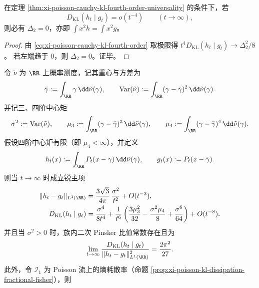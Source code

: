 \begin{corollary}\label{cor:xi-poisson-cauchy-kl-moment-locking}
在定理 \ref{thm:xi-poisson-cauchy-kl-fourth-order-universality} 的条件下，若
\[
D_{\mathrm{KL}}(h_t\mid g_t)=o(t^{-4})\qquad(t\to\infty),
\]
则必有 \(\Delta_2=0\)，亦即 \(\int x^2h=\int x^2g\)。
\end{corollary}

\begin{proof}
由 \eqref{eq:xi-poisson-cauchy-kl-fourth-order} 取极限得
\(
t^4D_{\mathrm{KL}}(h_t\mid g_t)\to \Delta_2^2/8
\)。
若左端趋于 \(0\)，则 \(\Delta_2=0\)。证毕。
\end{proof}

\begin{corollary}\label{cor:xi-poisson-cauchy-mixture-point-leading-constants}
令 \(\tilde\nu\) 为 \(\RR\) 上概率测度，记其重心与方差为
\[
\bar\gamma:=\int_{\RR}\gamma\,\dd\tilde\nu(\gamma),
\qquad
\mathrm{Var}(\tilde\nu):=\int_{\RR}(\gamma-\bar\gamma)^2\,\dd\tilde\nu(\gamma).
\]
并记三、四阶中心矩
\[
\sigma^2:=\mathrm{Var}(\tilde\nu),\qquad
\mu_3:=\int_{\RR}(\gamma-\bar\gamma)^3\,\dd\tilde\nu(\gamma),\qquad
\mu_4:=\int_{\RR}(\gamma-\bar\gamma)^4\,\dd\tilde\nu(\gamma).
\]
假设四阶中心矩有限（即 \(\mu_4<\infty\)），并定义
\[
h_t(x):=\int_{\RR}P_t(x-\gamma)\,\dd\tilde\nu(\gamma),
\qquad
g_t(x):=P_t(x-\bar\gamma).
\]
则当 \(t\to\infty\) 时成立锐主项
\begin{align}
\|h_t-g_t\|_{L^1(\RR)}&=\frac{3\sqrt3}{4\pi}\,\frac{\sigma^2}{t^2}+O(t^{-3}),\label{eq:xi-poisson-cauchy-mixture-tv-leading}\\
D_{\mathrm{KL}}(h_t\mid g_t)&=\frac{\sigma^4}{8t^4}
+\frac{1}{t^6}\left(
\frac{3\mu_3^2}{32}
-\frac{\sigma^2\mu_4}{8}
+\frac{\sigma^6}{64}
\right)
+O(t^{-8}).\label{eq:xi-poisson-cauchy-mixture-kl-leading}
\end{align}
\noindent
并且当 \(\sigma^2>0\) 时，族内二次 Pinsker 比值常数存在且为
\begin{equation}\label{eq:xi-poisson-cauchy-mixture-kl-tv-sharp-ratio}
\lim_{t\to\infty}\frac{D_{\mathrm{KL}}(h_t\mid g_t)}{\|h_t-g_t\|_{L^1(\RR)}^2}
=\frac{2\pi^2}{27}.
\end{equation}
此外，令 \(\mathcal I_1\) 为 Poisson 流上的熵耗散率（命题 \ref{prop:xi-poisson-kl-dissipation-fractional-fisher}），则
\begin{equation}\label{eq:xi-poisson-cauchy-mixture-fisher-leading}

\end{equation}
\end{corollary}
